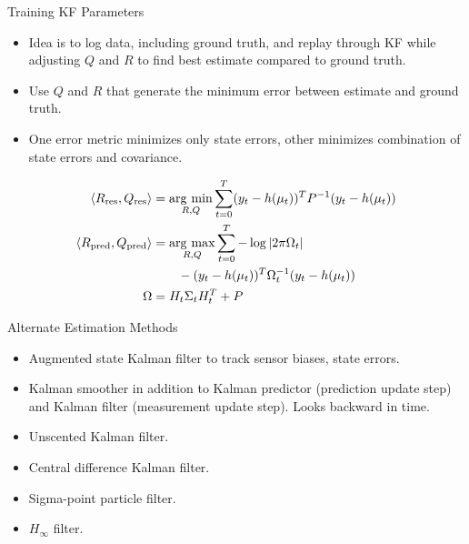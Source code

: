 \documentclass[hyperref={pdfpagelabels=false}]{beamer}
\begin{document}
\begin{frame}{Training KF Parameters}
\begin{itemize}
\item Idea is to log data, including ground truth, and replay through KF while adjusting $Q$ and $R$ to find best estimate compared to ground truth.
\item Use $Q$ and $R$ that generate the minimum error between estimate and ground truth.
\item One error metric minimizes only state errors, other minimizes combination of state errors and covariance.
\end{itemize}
\begin{align*}
\left<R_{\text{res}},Q_{\text{res}}\right> &= \mathop{\arg\,\min}\limits_{R,Q}\sum_{t=0}^T (y_t-h(\mu_t))^TP^{-1}(y_t-h(\mu_t)) \\
\left<R_{\text{pred}},Q_{\text{pred}}\right> &= \mathop{\arg\,\max}\limits_{R,Q}\sum_{t=0}^T -\log|2\pi\Omega_t| \\
&\qquad - (y_t-h(\mu_t))^T\Omega_t^{-1}(y_t-h(\mu_t)) \\
\Omega &= H_t\Sigma_tH_t^T+P
\end{align*}
\end{frame}

\begin{frame}{Alternate Estimation Methods}
\begin{itemize}
\item Augmented state Kalman filter to track sensor biases, state errors.
\item Kalman smoother in addition to Kalman predictor (prediction update step) and Kalman filter (measurement update step). Looks backward in time.
\item Unscented Kalman filter.
\item Central difference Kalman filter.
\item Sigma-point particle filter.
\item $H_\infty$ filter.
\end{itemize}
\end{frame}
\end{document}
